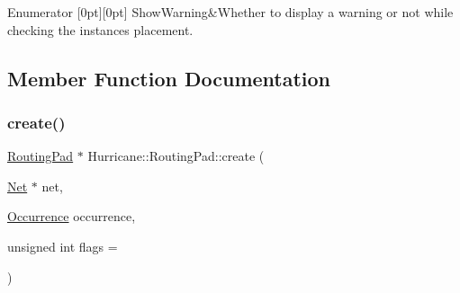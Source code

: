 \begin{DoxyEnumFields}{Enumerator}
[0pt][0pt]{}\mbox{\label{classHurricane_1_1RoutingPad_a69f37f0b06b9bfd758d9be42c71e2bd4a8fd74358022a29aab828700c8f7347ba}} 
Show\+Warning&Whether to display a warning or not while checking the instances placement. \\
\hline

\end{DoxyEnumFields}


\subsection{Member Function Documentation}
\mbox{\label{classHurricane_1_1RoutingPad_a87c3a286477f81b9c791dc24104a3e51}} 
\subsubsection{\texorpdfstring{create()}{create()}\hspace{0.1cm}{\footnotesize\ttfamily [1/2]}}
{\footnotesize\ttfamily \hyperlink{classHurricane_1_1RoutingPad}{Routing\+Pad} $\ast$ Hurricane\+::\+Routing\+Pad\+::create (\begin{DoxyParamCaption}\item[{\hyperlink{classHurricane_1_1Net}{Net} $\ast$}]{net,  }\item[{\hyperlink{classHurricane_1_1Occurrence}{Occurrence}}]{occurrence,  }\item[{unsigned int}]{flags = {} }\end{DoxyParamCaption})\hspace{0.3cm}{\ttfamily [static]}}


